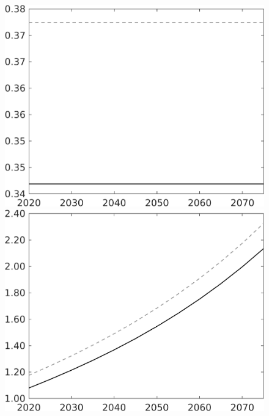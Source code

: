 \documentclass[12pt]{article}
\begin{document}
\begin{figure}[h!!]
\begin{minipage}[]{0.32\textwidth}
	\end{minipage}	
	\begin{minipage}[]{0.32\textwidth}
		\includegraphics[width=1\textwidth]{../../codding_model/own_basedOnFried/optimalPol_010922_revision/figures/all_13Sept22/CompTaul_Equlab_LFBAU_Reg0_hh_spillover0_nsk1_xgr1_knspil0_sep1_countec0_GovRev0_etaa0.79_lgd0.png}
	\end{minipage}	
	\begin{minipage}[]{0.32\textwidth}
		\includegraphics[width=1\textwidth]{../../codding_model/own_basedOnFried/optimalPol_010922_revision/figures/all_13Sept22/CompTaul_Equlab_LFBAU_Reg0_C_spillover0_nsk1_xgr1_knspil0_sep1_countec0_GovRev0_etaa0.79_lgd0.png}

\end{minipage}
\end{figure}
\end{document}
